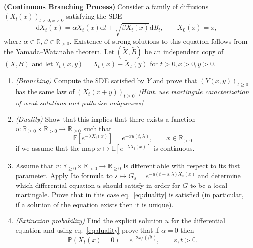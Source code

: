 \documentclass{article}
\newcommand{\mathd}{\mathrm{d}}
\newcommand{\tmem}[1]{{\em #1\/}}
\newcommand{\tmtextbf}[1]{{\bfseries{#1}}}
\newcommand{\tmtextit}[1]{{\itshape{#1}}}
\newenvironment{enumeratealpha}{\begin{enumerate}[a{\textup{)}}] }{\end{enumerate}}
{\theorembodyfont{\rmfamily\small}\newtheorem{exercise}{Exercise}}
\begin{document}
\

\hrulefill

\begin{exercise}
  [Pts 3+3+3+2] \tmtextbf{(Continuous Branching Process)} Consider a family of
  diffusions $(X_t (x))_{t > 0, x > 0}$ satisfying the SDE
  \[ \mathd X_t (x) = \alpha X_t (x) \mathd t + \sqrt{\beta X_t (x)} \mathd
     B_t, \qquad X_0 (x) = x, \]
  where $\alpha \in \mathbb{R}, \beta \in \mathbb{R}_{> 0}$. Existence of
  strong solutions to this equation follows from the Yamada--Watanabe theorem.
  Let $(\tilde{X}, \tilde{B})$ be an independent copy of $(X, B)$ and let $Y_t
  (x, y) = X_t (x) + \tilde{X}_t (y)$ for $t > 0, x > 0, y > 0$.
  \begin{enumeratealpha}
    \item \tmtextit{(Branching)} Compute the SDE satisfied by $Y$ and prove
    that $(Y (x, y))_{t \geqslant 0}$ has the same law of $(X_t (x + y))_{t
    \geqslant 0}$. \tmtextit{[Hint: use martingale caracterization of weak
    solutions and pathwise uniqueness]}
    
    \item \tmtextit{(Duality)} Show that this implies that there exists a
    function $u : \mathbb{R}_{\geqslant 0} \times \mathbb{R}_{> 0} \rightarrow
    \mathbb{R}_{\geqslant 0}$ such that
    \begin{equation}
      \mathbb{E} [e^{- \lambda X_t (x)}] = e^{- xu (t, \lambda)}, \qquad x \in
      \mathbb{R}_{> 0} \label{eq:duality}
    \end{equation}
    if we assume that the map $x \mapsto \mathbb{E} [e^{- \lambda X_t (x)}]$
    is continuous.
    
    \item Assume that $u : \mathbb{R}_{\geqslant 0} \times \mathbb{R}_{> 0}
    \rightarrow \mathbb{R}_{\geqslant 0}$ is differentiable with respect to
    its first parameter. Apply Ito formula to $s \mapsto G_s = e^{- u (t - s,
    \lambda) X_s (x)}$ and determine which differential equation $u$ should
    satisfy in order for $G$ to be a local martingale. Prove that in this case
    eq.~{\eqref{eq:duality}} is satisfied (in particular, if a solution of the
    equation exists then it is unique).
    
    \item {\tmem{(Extinction probability)}} Find the explicit solution $u$ for
    the differential equation and using eq.~{\eqref{eq:duality}} prove that if
    $\alpha = 0$ then
    \[ \mathbb{P} (X_t (x) = 0) = e^{- 2 x / (\beta t)}, \qquad x, t > 0. \]
  \end{enumeratealpha}
\end{exercise}

\

\hrulefill

\
\end{document}
